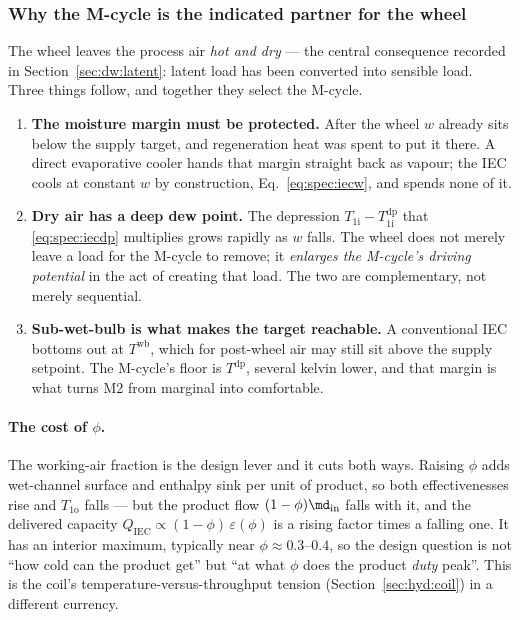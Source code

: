 \subsubsection{Why the M-cycle is the indicated partner for the wheel}
The wheel leaves the process air \emph{hot and dry} --- the central consequence recorded in
Section~\ref{sec:dw:latent}: latent load has been converted into sensible load. Three things follow,
and together they select the M-cycle.
\begin{enumerate}[nosep]
\item \textbf{The moisture margin must be protected.} After the wheel $w$ already sits below the
supply target, and regeneration heat was spent to put it there. A direct evaporative cooler hands
that margin straight back as vapour; the IEC cools at constant $w$ by construction,
Eq.~\eqref{eq:spec:iecw}, and spends none of it.
\item \textbf{Dry air has a deep dew point.} The depression $T_{\mathrm{1i}}-T_{\mathrm{1i}}^{
\mathrm{dp}}$ that \eqref{eq:spec:iecdp} multiplies grows rapidly as $w$ falls. The wheel does not
merely leave a load for the M-cycle to remove; it \emph{enlarges the M-cycle's driving potential} in
the act of creating that load. The two are complementary, not merely sequential.
\item \textbf{Sub-wet-bulb is what makes the target reachable.} A conventional IEC bottoms out at
$T^{\mathrm{wb}}$, which for post-wheel air may still sit above the supply setpoint. The M-cycle's
floor is $T^{\mathrm{dp}}$, several kelvin lower, and that margin is what turns M2 from marginal into
comfortable.
\end{enumerate}

\paragraph{The cost of $\phi$.} The working-air fraction is the design lever and it cuts both ways.
Raising $\phi$ adds wet-channel surface and enthalpy sink per unit of product, so both effectivenesses
rise and $T_{\mathrm{1o}}$ falls --- but the product flow $(1-\phi)\md_{\mathrm{in}}$ falls with it,
and the delivered capacity $Q_{\mathrm{IEC}}\propto(1-\phi)\,\varepsilon(\phi)$ is a rising factor
times a falling one. It has an interior maximum, typically near $\phi\approx\numrange{0.3}{0.4}$,
so the design question is not ``how cold can the product get'' but ``at what $\phi$ does the
product \emph{duty} peak''. This is the coil's temperature-versus-throughput tension
(Section~\ref{sec:hyd:coil}) in a different currency.

